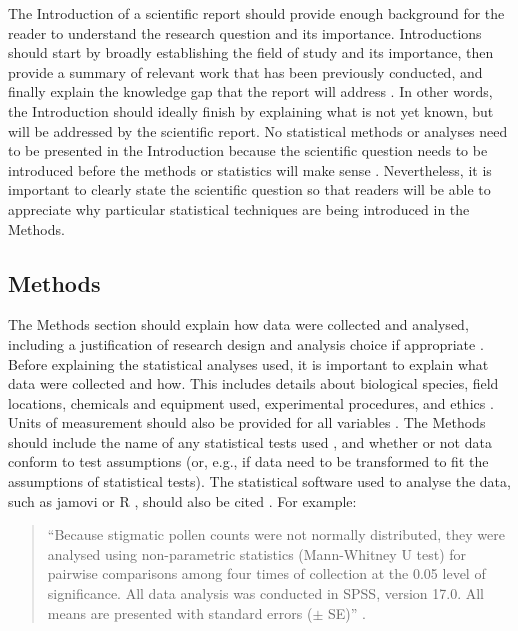 \documentclass[
]{scrbook}
\begin{document}
The Introduction of a scientific report should provide enough background for the reader to understand the research question and its importance.
Introductions should start by broadly establishing the field of study and its importance, then provide a summary of relevant work that has been previously conducted, and finally explain the knowledge gap that the report will address \citep{Woodford1999, Turbek2016}.
In other words, the Introduction should ideally finish by explaining what is not yet known, but will be addressed by the scientific report.
No statistical methods or analyses need to be presented in the Introduction because the scientific question needs to be introduced before the methods or statistics will make sense \citep{Bouma2000}.
Nevertheless, it is important to clearly state the scientific question so that readers will be able to appreciate why particular statistical techniques are being introduced in the Methods.

\hypertarget{methods}{%
\subsection{Methods}\label{methods}}

The Methods section should explain how data were collected and analysed, including a justification of research design and analysis choice if appropriate \citep{Bouma2000}.
Before explaining the statistical analyses used, it is important to explain what data were collected and how.
This includes details about biological species, field locations, chemicals and equipment used, experimental procedures, and ethics \citep{council2006scientific, Woodford1999}.
Units of measurement should also be provided for all variables \citep{Lang1997}.
The Methods should include the name of any statistical tests used \citep{council2006scientific}, and whether or not data conform to test assumptions (or, e.g., if data need to be transformed to fit the assumptions of statistical tests).
The statistical software used to analyse the data, such as jamovi \citep{Jamovi2022} or R \citep{Rproject}, should also be cited \citep{Lang1997, council2006scientific}.
For example:

\begin{quote}
``Because stigmatic pollen counts were not normally distributed, they were analysed using non-parametric statistics (Mann-Whitney U test) for pairwise comparisons among four times of collection at the 0.05 level of significance. All data analysis was conducted in SPSS, version 17.0. All means are presented with standard errors (\(\pm\) SE)'' \citep{Xiong2013}.
\end{quote}
\end{document}
